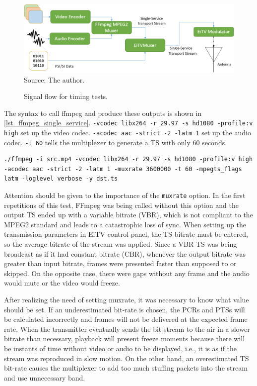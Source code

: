 \documentclass[
	12pt,				%
	openright,			%
	twoside,			%
	a4paper,			%
	brazil,
	french,				%
	english
	]{abntex2}
\begin{document}
\begin{figure}[!hb]
\centering
\caption{Signal flow for timing tests.}
\includegraphics[width=0.9\linewidth]{figuras/test_scn_timing.png}
\\Source: The author.
\label{fig:test_scn_timing}
\end{figure}

The syntax to call ffmpeg and produce these outputs is shown in \autoref{lst_ffmpeg_single_service}. \texttt{-vcodec libx264 -r 29.97 -s hd1080 -profile:v high} set up the video codec. \texttt{-acodec aac -strict -2 -latm 1} set up the audio codec. \texttt{-t 60} tells the multiplexer to generate a TS with only 60 seconds.

\begin{minipage}{\linewidth}
\begin{lstlisting}[caption={Single Service TS creation with FFmpeg.}, label={lst_ffmpeg_single_service}]
./ffmpeg -i src.mp4 -vcodec libx264 -r 29.97 -s hd1080 -profile:v high -acodec aac -strict -2 -latm 1 -muxrate 3600000 -t 60 -mpegts_flags latm -loglevel verbose -y dst.ts
\end{lstlisting}
\end{minipage}

Attention should be given to the importance of the \texttt{muxrate} option. In the first repetitions of this test, FFmpeg was being called without this option and the output TS ended up with a variable bitrate (VBR), which is not compliant to the MPEG2 standard and leads to a catastrophic loss of sync. When setting up the transmission parameters in EiTV control panel, the TS bitrate must be entered, so the average bitrate of the stream was applied. Since a VBR TS was being broadcast as if it had constant bitrate (CBR), whenever the output bitrate was greater than input bitrate, frames were presented faster than supposed to or skipped. On the opposite case, there were gaps without any frame and the audio would mute or the video would freeze.

After realizing the need of setting muxrate, it was necessary to know what value should be set. If an underestimated bit-rate is chosen, the PCRs and PTSs will be calculated incorrectly and frames will not be delivered at the expected frame rate. When the transmitter eventually sends the bit-stream to the air in a slower bitrate than necessary, playback will present freeze moments because there will be instants of time without video or audio to be displayed, i.e., it is as if the stream was reproduced in slow motion. On the other hand, an overestimated TS bit-rate causes the multiplexer to add too much stuffing packets into the stream and use unnecessary band.
\end{document}

